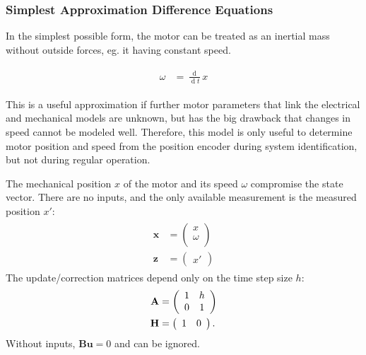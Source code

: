 \documentclass[12pt,a4paper,oneside,openany]{article}
\DeclareMathOperator{\ud}{d}
\newcommand{\vx}{\ensuremath{\mathbf{x}}}
\newcommand{\vz}{\ensuremath{\mathbf{z}}}
\newcommand{\vu}{\ensuremath{\mathbf{u}}}
\newcommand{\mA}{\ensuremath{\mathbf{A}}}
\newcommand{\mB}{\ensuremath{\mathbf{B}}}
\newcommand{\mH}{\ensuremath{\mathbf{H}}}
\begin{document}
\subsubsection{Simplest Approximation Difference Equations}

In the simplest possible form, the motor can be treated as an inertial mass without outside forces, eg.{} it having constant speed.

\begin{gather}
\begin{aligned}
\omega &= \frac{\ud}{\ud t} x
\end{aligned}
\end{gather}

This is a useful approximation if further motor parameters that link the electrical and mechanical models are unknown, but has the big drawback that changes in speed cannot be modeled well. Therefore, this model is only useful to determine motor position and speed from the position encoder during system identification, but not during regular operation.

The mechanical position $x$ of the motor and its speed $\omega$ compromise the state vector. There are no inputs, and the only available measurement is the measured position $x'$:
\begin{gather}
\begin{aligned}
\vx &= \left(
\begin{array}{c}
      x  \\
 \omega \\
\end{array}
\right) \\
\vz &= \left(
\begin{array}{c}
      x'
\end{array}
\right)
\end{aligned}
\end{gather}
The update/correction matrices depend only on the time step size $h$:
\begin{gather}
\begin{aligned}
\mA &= \left(
\begin{array}{cc}
 1 & h \\
 0 & 1 \\
\end{array}
\right) \\
\mH &= \left(
\begin{array}{c c}
 1 & 0
\end{array}
\right).
\end{aligned}
\end{gather}
Without inputs, $\mB\vu = 0$ and can be ignored.
\end{document}
